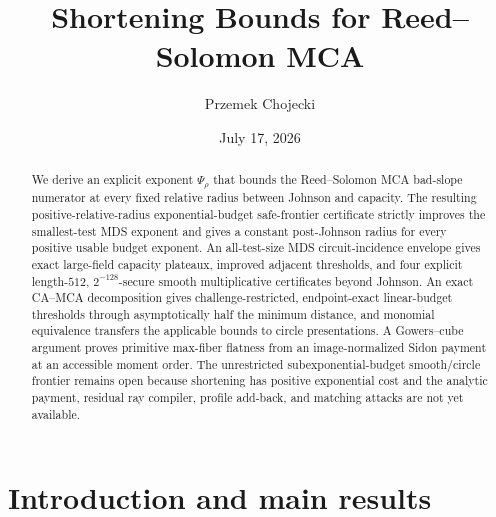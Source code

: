 \documentclass[11pt,a4paper]{amsart}
\title{Shortening Bounds for Reed--Solomon MCA}
\author{Przemek Chojecki}
\date{July 17, 2026}
\numberwithin{equation}{section}
\theoremstyle{remark}
\begin{document}
\raggedbottom

\begin{abstract}
We derive an explicit exponent \(\Psi_\rho\) that bounds the Reed--Solomon MCA bad-slope numerator at every fixed relative radius between Johnson and capacity.  The resulting positive-relative-radius exponential-budget safe-frontier certificate strictly improves the smallest-test MDS exponent and gives a constant post-Johnson radius for every positive usable budget exponent.  An all-test-size MDS circuit-incidence envelope gives exact large-field capacity plateaux, improved adjacent thresholds, and four explicit length-\(512\), \(2^{-128}\)-secure smooth multiplicative certificates beyond Johnson.  An exact CA--MCA decomposition gives challenge-restricted, endpoint-exact linear-budget thresholds through asymptotically half the minimum distance, and monomial equivalence transfers the applicable bounds to circle presentations.  A Gowers--cube argument proves primitive max-fiber flatness from an image-normalized Sidon payment at an accessible moment order.  The unrestricted subexponential-budget smooth/circle frontier remains open because shortening has positive exponential cost and the analytic payment, residual ray compiler, profile add-back, and matching attacks are not yet available.
\end{abstract}

\maketitle
\setcounter{tocdepth}{1}
\tableofcontents
\clearpage

\section{Introduction and main results}\label{sec:introduction}
\end{document}
